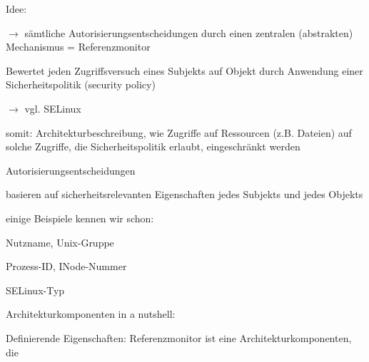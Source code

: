 \documentclass[a4paper]{article}
\begin{document}
\begin{multicols}{3}
    \begin{itemize*}
        \item
        Idee:
        \begin{itemize*}
            \item $\rightarrow$  sämtliche Autorisierungsentscheidungen durch einen zentralen (abstrakten) Mechanismus = Referenzmonitor
            \item Bewertet jeden Zugriffsversuch eines Subjekts auf Objekt durch Anwendung einer Sicherheitspolitik (security policy) \begin{itemize*} \item   $\rightarrow$  vgl. SELinux \end{itemize*}
            \item somit: Architekturbeschreibung, wie Zugriffe auf Ressourcen (z.B. Dateien) auf solche Zugriffe, die Sicherheitspolitik erlaubt, eingeschränkt werden
        \end{itemize*}
        \item
        Autorisierungsentscheidungen
        \begin{itemize*}
            \item basieren auf sicherheitsrelevanten Eigenschaften jedes Subjekts und jedes Objekts
            \item einige Beispiele kennen wir schon: \begin{itemize*} \item   Nutzname, Unix-Gruppe \item   Prozess-ID, INode-Nummer \item   SELinux-Typ \end{itemize*}
        \end{itemize*}
        \item
        Architekturkomponenten in a nutshell:
    \end{itemize*}

    Definierende Eigenschaften: Referenzmonitor ist eine
    Architekturkomponenten, die


\end{multicols}
\end{document}

